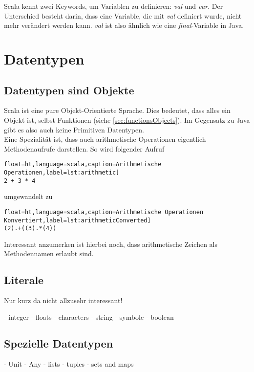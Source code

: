 Scala kennt zwei Keywords, um Variablen zu definieren: \emph{val} und 
\emph{var}. Der Unterschied besteht darin, dass eine Variable, die mit
\emph{val} definiert wurde, nicht mehr verändert werden kann. \emph{val}
ist also ähnlich wie eine \emph{final}-Variable in Java.

\section{Datentypen}
\label{sec:datatypes}

\subsection{Datentypen sind Objekte}

Scala ist eine pure Objekt-Orientierte Sprache. Dies bedeutet, dass alles
ein Objekt ist, selbst Funktionen (siehe \ref{sec:functionsObjects}). Im
Gegensatz zu Java gibt es also auch keine Primitiven Datentypen.\\

Eine Spezialität ist, dass auch arithmetische Operationen eigentlich
Methodenaufrufe darstellen. So wird folgender Aufruf

\begin{lstlisting}float=ht,language=scala,caption=Arithmetische Operationen,label=lst:arithmetic]
2 + 3 * 4
\end{lstlisting}

umgewandelt zu
\begin{lstlisting}float=ht,language=scala,caption=Arithmetische Operationen Konvertiert,label=lst:arithmeticConverted]
(2).+((3).*(4))
\end{lstlisting}

Interessant anzumerken ist hierbei noch, dass arithmetische Zeichen
als Methodennamen erlaubt sind.

\subsection{Literale}
Nur kurz da nicht allzusehr interessant!

- integer
- floats
- characters
- string
- symbole
- boolean


\subsection{Spezielle Datentypen}

- Unit
- Any
- lists
- tuples
- sets and maps
